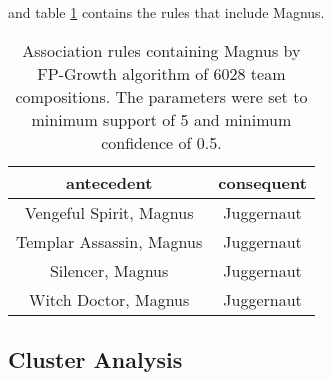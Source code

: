 \documentclass[result.tex]{subfiles}
\begin{document}
and table \ref{tab:ass_magnus} contains the rules that include Magnus.

\begin{table}[H]
  \centering
  \begin{tabular}{ | c | c | }
    \hline
    antecedent & consequent \\ \hline
    Vengeful Spirit, Magnus & Juggernaut \\ \hline
    Templar Assassin, Magnus & Juggernaut \\ \hline
    Silencer, Magnus & Juggernaut \\ \hline
    Witch Doctor, Magnus & Juggernaut  \\
    \hline
  \end{tabular}
  \caption{Association rules containing Magnus by FP-Growth algorithm of 6028 team compositions. The parameters were set to minimum support of 5 and minimum confidence of 0.5.}
  \label{tab:ass_magnus}
\end{table}

\subsection*{Cluster Analysis}
\end{document}
